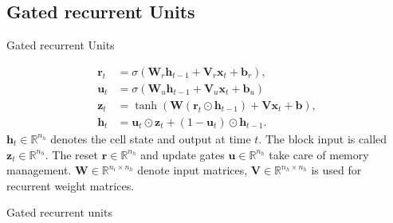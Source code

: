 \documentclass{beamer}
\begin{document}
    \subsection{Gated recurrent Units}
    \begin{frame}{Gated recurrent Units}
        
      \begin{align}
          \mathbf{r}_t &= \sigma( \mathbf{W}_r \mathbf{h}_{t-1}
           + \mathbf{V}_r \mathbf{x}_t + \mathbf{b}_r), \label{eq:resetbar} \\
          \mathbf{u}_t &= \sigma( \mathbf{W}_u \mathbf{h}_{t-1}
           + \mathbf{V}_u \mathbf{x}_t + \mathbf{b}_u ) \\
          \mathbf{z}_t &= \tanh( \mathbf{W} (\mathbf{r}_t \odot \mathbf{h}_{t-1})
           + \mathbf{V}\mathbf{x}_t + \mathbf{b}), \label{eq:gru_state} \\
          \mathbf{h}_t &= \mathbf{u}_t \odot \mathbf{z}_t
                           + (1 - \mathbf{u}_t) \odot \mathbf{h}_{t-1}. \label{eq:gru_final}
        \end{align}
        $\mathbf{h}_t \in \mathbb{R}^{n_h}$ denotes the cell state and output at time $t$.
        The block input is called $\mathbf{z}_t \in \mathbb{R}^{n_h}$.
        The reset $\mathbf{r} \in \mathbb{R}^{n_h}$ and update gates $\mathbf{u} \in \mathbb{R}^{n_h}$ take care of memory management.
        $\mathbf{W} \in \mathbb{R}^{n_i \times n_h}$ denote input matrices, 
        $\mathbf{V} \in \mathbb{R}^{n_h \times n_h}$ is used for recurrent weight matrices.
    \end{frame}


    \begin{frame}{Gated recurrent units}
      \begin{figure}
      
      \end{figure}
    \end{frame}
\end{document}
